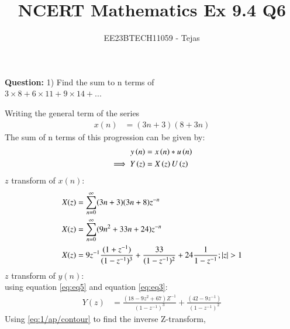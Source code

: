 \documentclass[journal,12pt,twocolumn]{IEEEtran}
\theoremstyle{remark}
\begin{document}

\vspace{3cm}

\title{NCERT Mathematics Ex 9.4 Q6}
\author{EE23BTECH11059 - Tejas$^{}$%
}
\maketitle
\newpage
\textbf{Question:}
1) Find the sum to n terms of\\$3 \times 8 + 6 \times 11 + 9 \times 14 + ...$
        

    
    \solution
        
        Writing the general term of the series
        \begin{align}
            x(n)&=(3n+3)(8+3n)  
        \end{align}
        The sum of n terms of this progression can be given by:
        \begin{align}
    y\left(n\right) &= x\left(n\right)*u\left(n\right)\\
    \implies  Y\left(z\right) &= X\left(z\right)U\left(z\right) \label{eq:eq3}
\end{align}
$z$ transform of $x(n)$:
        \begin{align}
            X(z) &= \sum_{n=0}^{\infty} (3n+3)(3n+8)z^{-n} \\
            X(z) &= \sum_{n=0}^{\infty} (9n^2 +33n+24)z^{-n} \\
            X(z)&=9z^{-1}\frac{(1+z^{-1})}{(1-z^{-1})^3} + \frac{33}{(1-z^{-1})^2} +24\frac{1}{1-z^{-1}}; \left\vert z\right\vert>1    \label{eq:eq5}
        \end{align}
        $z$ transform of $y(n)$:\\
        using equation \eqref{eq:eq5} and equation \eqref{eq:eq3}:
        \begin{align}
            Y(z)&= \frac{(18-9z^2+67)Z^{-1}}{(1-z^{-1})^3} + \frac{(42-9z^{-1})}{(1-z^{-1})^2} 
        \end{align}
        Using  \eqref{eq:1/ap/contour} to find the inverse Z-transform,
        
\end{document}
